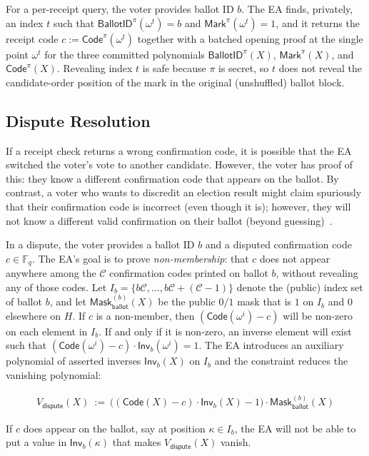 For a per-receipt query, the voter provides ballot ID $b$. The EA finds, privately, an index $t$ such that $\mathsf{BallotID}^{\pi}(\omega^t)=b$ and $\mathsf{Mark}^{\pi}(\omega^t)=1$, and it returns the receipt code $c:=\mathsf{Code}^{\pi}(\omega^t)$ together with a batched opening proof at the single point $\omega^t$ for the three committed polynomials $\mathsf{BallotID}^{\pi}(X)$, $\mathsf{Mark}^{\pi}(X)$, and $\mathsf{Code}^{\pi}(X)$. Revealing index $t$ is safe because $\pi$ is secret, so $t$ does not reveal the candidate-order position of the mark in the original (unshuffled) ballot block.

\subsection{Dispute Resolution}
\label{sec:dispute}

If a receipt check returns a wrong confirmation code, it is possible that the EA switched the voter's vote to another candidate. However, the voter has proof of this: they know a different confirmation code that appears on the ballot. By contrast, a voter who wants to discredit an election result might claim spuriously that their confirmation code is incorrect (even though it is); however, they will not know a different valid confirmation on their ballot (beyond guessing)~\cite{CCC+08}.

In a dispute, the voter provides a ballot ID $b$ and a disputed confirmation code $c\in\mathbb{F}_q$. The EA’s goal is to prove \emph{non-membership}: that $c$ does not appear anywhere among the $\mathcal{C}$ confirmation codes printed on ballot $b$, without revealing any of those codes. Let $I_b=\{b\mathcal{C},\ldots,b\mathcal{C}+(\mathcal{C}-1)\}$ denote the (public) index set of ballot $b$, and let $\mathsf{Mask}^{(b)}_{\mathsf{ballot}}(X)$ be the public $0/1$ mask that is $1$ on $I_b$ and $0$ elsewhere on $H$. If $c$ is a non-member, then $(\mathsf{Code}(\omega^i)-c)$ will be non-zero on each element in $I_b$. If and only if it is non-zero, an inverse element will exist such that $(\mathsf{Code}(\omega^i)-c) \cdot \mathsf{Inv}_b(\omega^i)=1$. The EA introduces an auxiliary polynomial of asserted inverses $\mathsf{Inv}_b(X)$ on $I_b$ and the constraint reduces the vanishing polynomial:

\begin{mdframed}[linewidth=0.6pt,backgroundcolor=verylightpink,innerleftmargin=6pt,innerrightmargin=6pt,innertopmargin=4pt,innerbottommargin=4pt]
\[
\begin{aligned}
V_{\mathsf{dispute}}(X)\ :=\ \bigl((\mathsf{Code}(X)-c)\cdot \mathsf{Inv}_b(X)-1\bigr)\cdot \mathsf{Mask}^{(b)}_{\mathsf{ballot}}(X)
\end{aligned}
\]
\end{mdframed}

 If $c$ does appear on the ballot, say at position $\kappa\in I_b$, the EA will not be able to put a value in $\mathsf{Inv}_b(\kappa)$ that makes $V_{\mathsf{dispute}}(X)$ vanish. 
